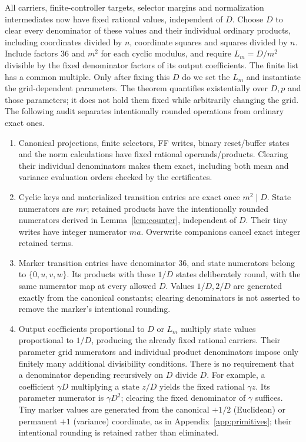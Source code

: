 \documentclass[10pt]{article}
\theoremstyle{remark}
\begin{document}
All carriers, finite-controller targets, selector margins and normalization
intermediates now have fixed rational values, independent of $D$. Choose $D$
to clear every denominator of these values and their individual ordinary
products, including coordinates divided by $n$, coordinate squares and squares
divided by $n$. Include factors $36$ and $m^2$ for each cyclic modulus, and
require $L_m=D/m^2$ divisible by the fixed denominator factors of its output
coefficients. The finite list has a common multiple. Only after fixing this
$D$ do we set the $L_m$ and instantiate the grid-dependent parameters.
The theorem quantifies existentially over $D,p$ and those parameters; it does
not hold them fixed while arbitrarily changing the grid. The following audit
separates intentionally rounded operations from ordinary exact ones.
\begin{enumerate}
\setlength{\itemsep}{2pt}
\item Canonical projections, finite selectors, FF writes, binary reset/buffer
states and the norm calculations have fixed rational operands/products.
Clearing their individual denominators makes them exact, including both mean
and variance evaluation orders checked by the certificates.
\item Cyclic keys and materialized transition entries are exact once $m^2\mid D$.
State numerators are $mr$; retained products have the intentionally rounded
numerators derived in Lemma~\ref{lem:counter}, independent of $D$.
Their tiny writes have integer numerator $ma$. Overwrite companions cancel
exact integer retained terms.
\item Marker transition entries have denominator $36$, and state numerators
belong to $\{0,u,v,w\}$. Its products with these $1/D$ states deliberately
round, with the same numerator map at every allowed $D$. Values $1/D,2/D$
are generated exactly from the canonical constants; clearing denominators is
not asserted to remove the marker's intentional rounding.
\item Output coefficients proportional to $D$ or $L_m$ multiply state values
proportional to $1/D$, producing the already fixed rational carriers.
Their parameter grid numerators and individual product denominators impose
only finitely many additional divisibility conditions. There is no requirement
that a denominator depending recursively on $D$ divide $D$.
For example, a coefficient $\gamma D$ multiplying a state $z/D$ yields the
fixed rational $\gamma z$. Its parameter numerator is $\gamma D^2$;
clearing the fixed denominator of $\gamma$ suffices. Tiny marker values are
generated from the canonical $+1/2$ (Euclidean) or permanent $+1$ (variance)
coordinate, as in Appendix~\ref{app:primitives}; their intentional rounding
is retained rather than eliminated.
\end{enumerate}
\end{document}
